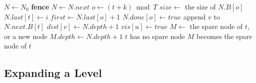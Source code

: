 \begin{algorithm}
\caption{Wait-free top-down BFS, as thread $t$ runs it. For a node $N = N_d$, $N.B[o]$, $N.\mathit{last}[o]$ and $N.\mathit{done}[o]$ stand for $B_{d,o}$, $\mathit{last}_{d,o}$ and $\mathit{done}_{d,o}$.}
\label{alg:wf-td}
\begin{algorithmic}[1]
    \State $N \gets N_0$
        \State \textbf{fence} \label{ln:td-fence}
        \State {}
        \State $N \gets N.\mathit{next}$ \label{ln:td-next}
    \EndWhile
\EndProcedure
\Statex
{}
        \State $o \gets (t + k) \bmod T$
         \label{ln:td-add}
        \State $\mathit{size} \gets$ the size of $N.B[o]$ \label{ln:td-size}
             \label{ln:td-own}
                \State {}
                \State $N.\mathit{last}[t] \gets i$ \label{ln:td-last}
            \EndFor
        \Else
            \State $\mathit{first} \gets N.\mathit{last}[o] + 1$ \label{ln:td-first}
             \label{ln:td-help}
                \State {}
            \EndFor
        \EndIf
        \State $N.\mathit{done}[o] \gets \mathit{true}$ \label{ln:td-done}
    \EndFor
\EndProcedure
\Statex
{}
            \State append $v$ to $N.\mathit{next}.B[t]$ \label{ln:td-push}
            \State $\mathit{dist}[v] \gets N.\mathit{depth} + 1$ \label{ln:td-dist}
        \EndIf
    \EndFor
    \State $\mathit{vis}[u] \gets \mathit{true}$ \label{ln:td-vis}
\EndProcedure
\Statex
{}
    \State $M \gets$ the spare node of $t$, or a new node
    \State $M.\mathit{depth} \gets N.\mathit{depth} + 1$
     \label{ln:td-cas}
        \State $t$ has no spare node
    \Else
        \State $M$ becomes the spare node of $t$
    \EndIf
\EndProcedure
\end{algorithmic}
\end{algorithm}

\subsection{Expanding a Level}
\label{sec:td-expand}

